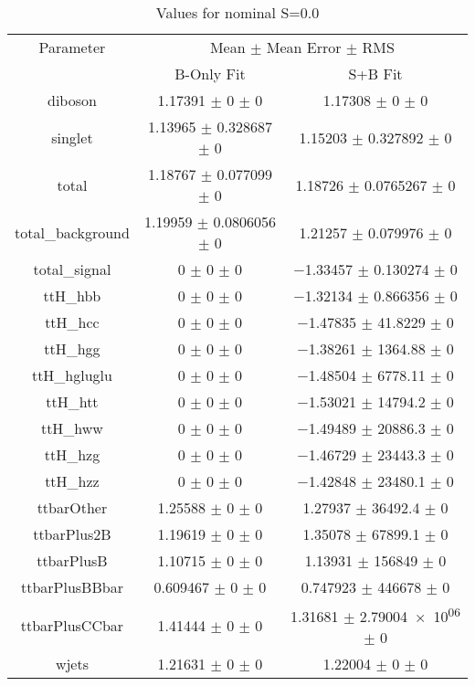 \begin{table}
\centering
\caption{Values for nominal S=0.0}
\begin{tabular}{ccc}
\toprule
Parameter & \multicolumn{2}{c}{Mean $\pm$ Mean Error $\pm$ RMS}\\
 & B-Only Fit & S+B Fit\\
\midrule
diboson & \num{1.17391} $\pm$ \num{0} $\pm$ \num{0} & \num{1.17308} $\pm$ \num{0} $\pm$ \num{0}\\
singlet & \num{1.13965} $\pm$ \num{0.328687} $\pm$ \num{0} & \num{1.15203} $\pm$ \num{0.327892} $\pm$ \num{0}\\
total & \num{1.18767} $\pm$ \num{0.077099} $\pm$ \num{0} & \num{1.18726} $\pm$ \num{0.0765267} $\pm$ \num{0}\\
total\_background & \num{1.19959} $\pm$ \num{0.0806056} $\pm$ \num{0} & \num{1.21257} $\pm$ \num{0.079976} $\pm$ \num{0}\\
total\_signal & \num{0} $\pm$ \num{0} $\pm$ \num{0} & \num{-1.33457} $\pm$ \num{0.130274} $\pm$ \num{0}\\
ttH\_hbb & \num{0} $\pm$ \num{0} $\pm$ \num{0} & \num{-1.32134} $\pm$ \num{0.866356} $\pm$ \num{0}\\
ttH\_hcc & \num{0} $\pm$ \num{0} $\pm$ \num{0} & \num{-1.47835} $\pm$ \num{41.8229} $\pm$ \num{0}\\
ttH\_hgg & \num{0} $\pm$ \num{0} $\pm$ \num{0} & \num{-1.38261} $\pm$ \num{1364.88} $\pm$ \num{0}\\
ttH\_hgluglu & \num{0} $\pm$ \num{0} $\pm$ \num{0} & \num{-1.48504} $\pm$ \num{6778.11} $\pm$ \num{0}\\
ttH\_htt & \num{0} $\pm$ \num{0} $\pm$ \num{0} & \num{-1.53021} $\pm$ \num{14794.2} $\pm$ \num{0}\\
ttH\_hww & \num{0} $\pm$ \num{0} $\pm$ \num{0} & \num{-1.49489} $\pm$ \num{20886.3} $\pm$ \num{0}\\
ttH\_hzg & \num{0} $\pm$ \num{0} $\pm$ \num{0} & \num{-1.46729} $\pm$ \num{23443.3} $\pm$ \num{0}\\
ttH\_hzz & \num{0} $\pm$ \num{0} $\pm$ \num{0} & \num{-1.42848} $\pm$ \num{23480.1} $\pm$ \num{0}\\
ttbarOther & \num{1.25588} $\pm$ \num{0} $\pm$ \num{0} & \num{1.27937} $\pm$ \num{36492.4} $\pm$ \num{0}\\
ttbarPlus2B & \num{1.19619} $\pm$ \num{0} $\pm$ \num{0} & \num{1.35078} $\pm$ \num{67899.1} $\pm$ \num{0}\\
ttbarPlusB & \num{1.10715} $\pm$ \num{0} $\pm$ \num{0} & \num{1.13931} $\pm$ \num{156849} $\pm$ \num{0}\\
ttbarPlusBBbar & \num{0.609467} $\pm$ \num{0} $\pm$ \num{0} & \num{0.747923} $\pm$ \num{446678} $\pm$ \num{0}\\
ttbarPlusCCbar & \num{1.41444} $\pm$ \num{0} $\pm$ \num{0} & \num{1.31681} $\pm$ \num{2.79004e+06} $\pm$ \num{0}\\
wjets & \num{1.21631} $\pm$ \num{0} $\pm$ \num{0} & \num{1.22004} $\pm$ \num{0} $\pm$ \num{0}\\
\bottomrule
\end{tabular}
\end{table}